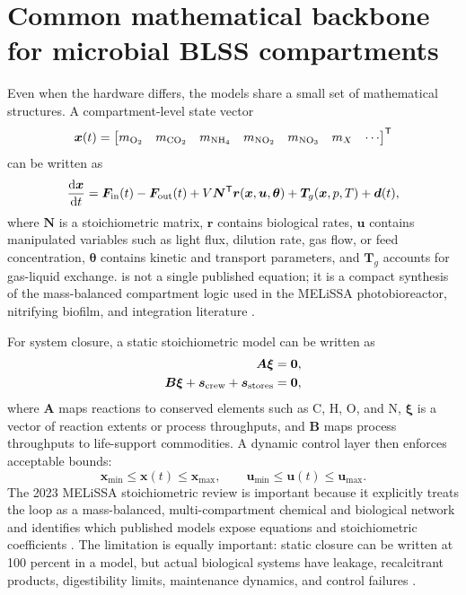 \documentclass[11pt]{article}
\newcommand{\MEL}{MELiSSA}
\newcommand{\BLSS}{BLSS}
\newcommand{\dd}{\mathrm{d}}
\begin{document}
\section{Common mathematical backbone for microbial \BLSS{} compartments}

Even when the hardware differs, the models share a small set of mathematical structures. A compartment-level state vector
\begin{equation}
  \bm x(t)=\begin{bmatrix}m_{\ce{O2}} & m_{\ce{CO2}} & m_{\ce{NH4}} & m_{\ce{NO2}} & m_{\ce{NO3}} & m_X & \cdots\end{bmatrix}^{\mathsf T}
\end{equation}
can be written as
\begin{equation}
  \frac{\dd \bm x}{\dd t}
  = \bm F_{\rm in}(t)-\bm F_{\rm out}(t)+V\bm N^{\mathsf T}\bm r(\bm x,\bm u,\bm \theta)
    + \bm T_g(\bm x,p,T)+\bm d(t),
  \label{eq:generic_compartment}
\end{equation}
where $\bm N$ is a stoichiometric matrix, $\bm r$ contains biological rates, $\bm u$ contains manipulated variables such as light flux, dilution rate, gas flow, or feed concentration, $\bm \theta$ contains kinetic and transport parameters, and $\bm T_g$ accounts for gas-liquid exchange.  is not a single published equation; it is a compact synthesis of the mass-balanced compartment logic used in the \MEL{} photobioreactor, nitrifying biofilm, and integration literature \parencite[2--3, 6]{poughon2021}\parencite[5--6]{garcia2021}\parencite[96--115]{montras2009}.

For system closure, a static stoichiometric model can be written as
\begin{align}
  \bm A \bm \xi &= \bm 0, \label{eq:element_balance}\\
  \bm B\bm \xi + \bm s_{\rm crew}+\bm s_{\rm stores} &= \bm 0, \label{eq:loop_balance}
\end{align}
where $\bm A$ maps reactions to conserved elements such as C, H, O, and N, $\bm \xi$ is a vector of reaction extents or process throughputs, and $\bm B$ maps process throughputs to life-support commodities. A dynamic control layer then enforces acceptable bounds:
\begin{equation}
  \bm x_{\min}\le \bm x(t)\le \bm x_{\max},\qquad
  \bm u_{\min}\le \bm u(t)\le \bm u_{\max}.
  \label{eq:bounds}
\end{equation}
The 2023 \MEL{} stoichiometric review is important because it explicitly treats the loop as a mass-balanced, multi-compartment chemical and biological network and identifies which published models expose equations and stoichiometric coefficients \parencite[Abstract, sec. 2--5]{vermeulen2023}. The limitation is equally important: static closure can be written at 100 percent in a model, but actual biological systems have leakage, recalcitrant products, digestibility limits, maintenance dynamics, and control failures \parencite[sec. 5]{vermeulen2023}.
\end{document}
